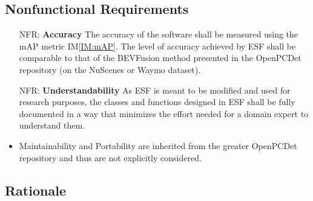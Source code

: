 \documentclass[12pt]{article}
\newcommand{\iref}[1]{IM\ref{#1}}
\newcounter{nfrnum} %
\newcommand{\ProjectName}{ESF }
\begin{document}
\subsection{Nonfunctional Requirements}
\noindent \begin{itemize}

\item[NFR\refstepcounter{nfrnum}\thenfrnum \label{NFR:Accuracy}:]
  \textbf{Accuracy} The accuracy of the software shall be measured using the mAP metric \iref{IM:mAP}. The level of accuracy achieved
  by \ProjectName shall be comparable to that of the BEVFusion method \cite{liang2022bevfusion} presented in the OpenPCDet repository \cite{openpcdet2020} (on the NuScenes \cite{caesar2020nuscenes} or Waymo \cite{sun2020scalability} dataset). 

\item[NFR\refstepcounter{nfrnum}\thenfrnum \label{NFR:Understandability}:]
  \textbf{Understandability} As \ProjectName is meant to be modified and used for research purposes,
    the classes and functions designed in \ProjectName shall be fully documented in a way that minimizes the effort needed
    for a domain expert to understand them.

\item Maintainability and Portability are inherited from the greater OpenPCDet repository \cite{openpcdet2020} and thus are not explicitly considered.

\end{itemize}

\subsection{Rationale}
\end{document}

